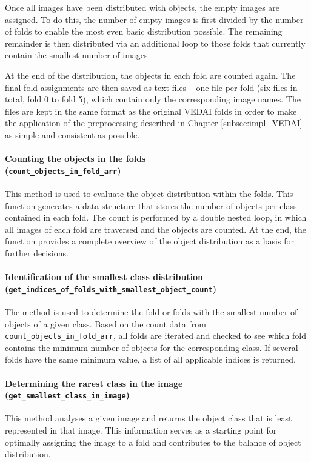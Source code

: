 Once all images have been distributed with objects, the empty images are assigned. To do this, the number of empty images is first divided by the number of folds to enable the most even basic distribution possible. The remaining remainder is then distributed via an additional loop to those folds that currently contain the smallest number of images.

At the end of the distribution, the objects in each fold are counted again. The final fold assignments are then saved as text files – one file per fold (six files in total, fold 0 to fold 5), which contain only the corresponding image names. The files are kept in the same format as the original \acrshort{VEDAI} folds in order to make the application of the preprocessing described in Chapter \ref{subsec:impl_VEDAI} as simple and consistent as possible.


\paragraph{Counting the objects in the folds \\ (\lstinline|count_objects_in_fold_arr|)}
\hypertarget{par:count_objects_in_fold_arr}{}

This method is used to evaluate the object distribution within the folds. This function generates a data structure that stores the number of objects per class contained in each fold. The count is performed by a double nested loop, in which all images of each fold are traversed and the objects are counted. At the end, the function provides a complete overview of the object distribution as a basis for further decisions.


\paragraph{Identification of the smallest class distribution \\ (\lstinline|get_indices_of_folds_with_smallest_object_count|)}
\hypertarget{par:get_indices_folds_with_smallest_object_count}{}

The method is used to determine the fold or folds with the smallest number of objects of a given class. Based on the count data from \hyperlink{par:count_objects_in_fold_arr}{\lstinline|count_objects_in_fold_arr|}, all folds are iterated and checked to see which fold contains the minimum number of objects for the corresponding class. If several folds have the same minimum value, a list of all applicable indices is returned.

\paragraph{Determining the rarest class in the image \\ (\lstinline|get_smallest_class_in_image|)}
\hypertarget{par:get_smallest_class_in_image}{}

This method analyses a given image and returns the object class that is least represented in that image. This information serves as a starting point for optimally assigning the image to a fold and contributes to the balance of object distribution.
